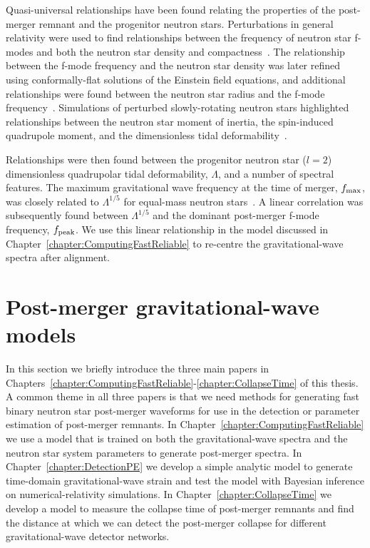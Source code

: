 \documentclass[../Thesis.tex]{subfiles}
\begin{document}
    Quasi-universal relationships have been found relating the properties of the post-merger remnant and the progenitor neutron stars. 
    Perturbations in general relativity were used to find relationships between the frequency of neutron star f-modes and both the neutron star density and compactness~\cite{Andersson1998b}.
    The relationship between the f-mode frequency and the neutron star density was later refined using conformally-flat solutions of the Einstein field equations, and additional relationships were found between the neutron star radius and the f-mode frequency~\cite{Bauswein2012,Bauswein2012a}.
    Simulations of perturbed slowly-rotating neutron stars highlighted relationships between the neutron star moment of inertia, the spin-induced quadrupole moment, and the dimensionless tidal deformability~\cite{Yagi2013,Yagi2013a}. \par

    Relationships were then found between the progenitor neutron star ($l=2$) dimensionless quadrupolar tidal deformability, $\Lambda$, and a number of spectral features.
    The maximum gravitational wave frequency at the time of merger, $f_{\mathrm{max}}$, was closely related to $\Lambda^{1/5}$ for equal-mass neutron stars~\cite{Read2013}.
    A linear correlation was subsequently found between $\Lambda^{1/5}$ and the dominant post-merger f-mode frequency, $f_{\mathrm{peak}}$.
    We use this linear relationship in the model discussed in Chapter~\ref{chapter:ComputingFastReliable} to re-centre the gravitational-wave spectra after alignment.


    
    
    \section{Post-merger gravitational-wave models} 
    \label{sec:Intro:Models}
    In this section we briefly introduce the three main papers in Chapters~\ref{chapter:ComputingFastReliable}-\ref{chapter:CollapseTime} of this thesis. 
    A common theme in all three papers is that we need methods for generating fast binary neutron star post-merger waveforms for use in the detection or parameter estimation of post-merger remnants.
    In Chapter~\ref{chapter:ComputingFastReliable} we use a model that is trained on both the gravitational-wave spectra and the neutron star system parameters to generate post-merger spectra.
    In Chapter~\ref{chapter:DetectionPE} we develop a simple analytic model to generate time-domain gravitational-wave strain and test the model with Bayesian inference on numerical-relativity simulations.
    In Chapter~\ref{chapter:CollapseTime} we develop a model to measure the collapse time of post-merger remnants and find the distance at which we can detect the post-merger collapse for different gravitational-wave detector networks.
    
\end{document}
